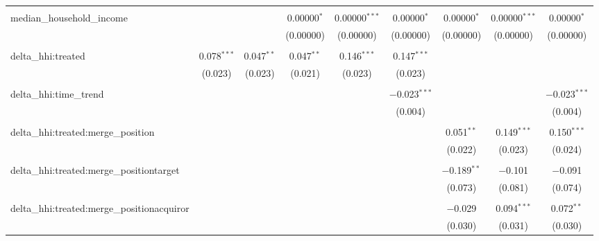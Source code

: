 \begin{table}[H]
{\begin{tabular}{@{\extracolsep{5pt}}lcccccccc}
   & & & & & & & & \\  

  median\_household\_income &  &  & 0.00000$^{*}$ & 0.00000$^{***}$ & 0.00000$^{*}$ & 0.00000$^{*}$ & 0.00000$^{***}$ & 0.00000$^{*}$ \\  

   &  &  & (0.00000) & (0.00000) & (0.00000) & (0.00000) & (0.00000) & (0.00000) \\  

   & & & & & & & & \\  

  delta\_hhi:treated & 0.078$^{***}$ & 0.047$^{**}$ & 0.047$^{**}$ & 0.146$^{***}$ & 0.147$^{***}$ &  &  &  \\  

   & (0.023) & (0.023) & (0.021) & (0.023) & (0.023) &  &  &  \\  

   & & & & & & & & \\  

  delta\_hhi:time\_trend &  &  &  &  & $-$0.023$^{***}$ &  &  & $-$0.023$^{***}$ \\  

   &  &  &  &  & (0.004) &  &  & (0.004) \\  

   & & & & & & & & \\  

  delta\_hhi:treated:merge\_position &  &  &  &  &  & 0.051$^{**}$ & 0.149$^{***}$ & 0.150$^{***}$ \\  

   &  &  &  &  &  & (0.022) & (0.023) & (0.024) \\  

   & & & & & & & & \\  

  delta\_hhi:treated:merge\_positiontarget &  &  &  &  &  & $-$0.189$^{**}$ & $-$0.101 & $-$0.091 \\  

   &  &  &  &  &  & (0.073) & (0.081) & (0.074) \\  

   & & & & & & & & \\  

  delta\_hhi:treated:merge\_positionacquiror &  &  &  &  &  & $-$0.029 & 0.094$^{***}$ & 0.072$^{**}$ \\  

   &  &  &  &  &  & (0.030) & (0.031) & (0.030) \\  


\end{tabular}}
\end{table}
